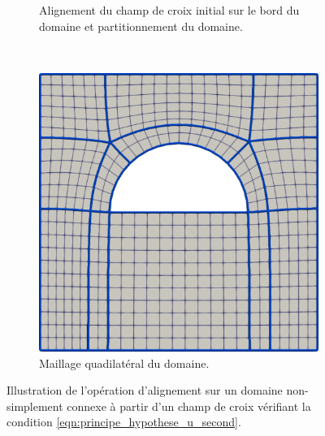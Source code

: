 \begin{figure}[!h]
\begin{subfigure}{0.495\textwidth}
    \caption{Alignement du champ de croix initial sur le bord du domaine et partitionnement du domaine.}
    \label{fig:carre_demi_disc_vide_bon_second}
\end{subfigure}
\\[0.8cm]
\begin{subfigure}{0.5\textwidth}
    \includegraphics[width=\textwidth]{images/carre_demi_disc_vide_bon_third.pdf}
    \caption{Maillage quadilatéral du domaine.}
    \label{fig:carre_demi_disc_vide_bon_third}
\end{subfigure}
\caption{Illustration de l'opération d'alignement sur un domaine non-simplement connexe à partir d'un champ de croix vérifiant la condition \eqref{eqn:principe_hypothese_u_second}.}
\label{fig:carre_demi_disc_vide_bon}
\end{figure}

